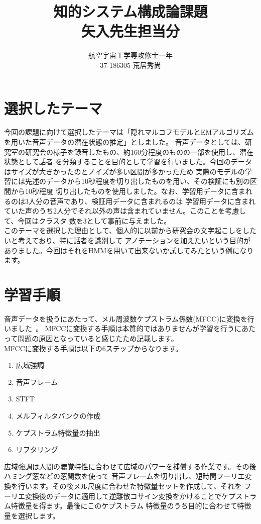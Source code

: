 \documentclass[10pt,a4paper]{ltjsarticle}       %
\title{知的システム構成論課題\\矢入先生担当分}
\author{航空宇宙工学専攻修士一年\\37-186305 荒居秀尚}
\begin{document}
\maketitle
\section{選択したテーマ}
今回の課題に向けて選択したテーマは「隠れマルコフモデルとEMアルゴリズムを用いた音声データの潜在状態の推定」としました。
音声データとしては、研究室の研究会の様子を録音したもの、約160分程度のものの一部を使用し、潜在状態として話者
を分類することを目的として学習を行いました。今回のデータはサイズが大きかったのとノイズが多い区間が多かったため
実際のモデルの学習には先述のデータから10秒程度を切り出したものを用い、その検証にも別の区間から10秒程度
切り出したものを使用しました。なお、学習用データに含まれるのは3人分の音声であり、検証用データに含まれるのは
学習用データに含まれていた声のうち2人分でそれ以外の声は含まれていません。このことを考慮して、今回はクラスタ
数を3として事前に与えました。\\

このテーマを選択した理由として、個人的に以前から研究会の文字起こしをしたいと考えており、特に話者を識別して
アノテーションを加えたいという目的がありました。今回はそれをHMMを用いて出来ないか試してみたという例になります。
\section{学習手順}
音声データを扱うにあたって、メル周波数ケプストラム係数(MFCC)に変換を行いました~\cite{soundrecognition}。
MFCCに変換する手順は本質的ではありませんが学習を行うにあたって問題の原因となっていると感じたため記載します。\\

MFCCに変換する手順は以下の6ステップからなります。
\begin{enumerate}
  \item 広域強調
  \item 音声フレーム
  \item STFT
  \item メルフィルタバンクの作成
  \item ケプストラム特徴量の抽出
  \item リフタリング
\end{enumerate}
広域強調は人間の聴覚特性に合わせて広域のパワーを補償する作業です。その後ハミング窓などの窓関数を使って
音声フレームを切り出し、短時間フーリエ変換を行います。その後メル尺度に合わせた特徴量セットを作成して、それを
フーリエ変換後のデータに適用して逆離散コサイン変換をかけることでケプストラム特徴量を得ます。最後にこのケプストラム
特徴量のうち目的に合わせて特徴量を選択します。\\
\end{document}
